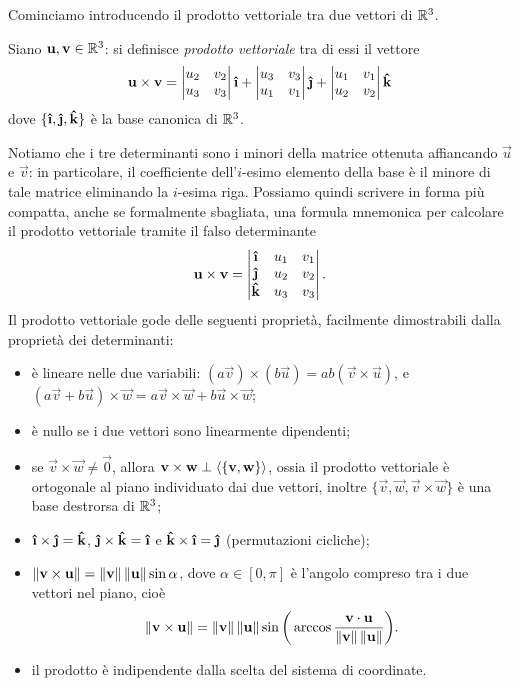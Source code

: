 Cominciamo introducendo il prodotto vettoriale tra due vettori di $\mathbb{R}^3$.
\begin{definizione} \label{d:prodotto-vettoriale}
	Siano $\mathbf{u},\mathbf{v}\in\mathbb{R}^3$: si definisce \emph{prodotto vettoriale} tra di essi il vettore
	\begin{equation}
		\vec u\times\vec v=
		\begin{vmatrix}
			u_2& v_2\\u_3&v_3
		\end{vmatrix}\ii+
		\begin{vmatrix}
			u_3&v_3\\u_1&v_1
		\end{vmatrix}\jj+
		\begin{vmatrix}
			u_1&v_1\\u_2&v_2
		\end{vmatrix}\kk
		\label{eq:prodotto-vettoriale}
	\end{equation}
	dove $\{\ii,\jj,\kk\}$ è la base canonica di $\mathbb{R}^3$.
\end{definizione}
Notiamo che i tre determinanti sono i minori della matrice ottenuta affiancando $\vec u$ e $\vec v$: in particolare, il coefficiente dell'$i$-esimo elemento della base è il minore di tale matrice eliminando la $i$-esima riga.
Possiamo quindi scrivere in forma più compatta, anche se formalmente sbagliata, una formula mnemonica per calcolare il prodotto vettoriale tramite il falso determinante
\begin{equation*}
	\vec u\times\vec v=
	\begin{vmatrix}
		\ii& u_1& v_1\\
		\jj& u_2& v_2\\
		\kk& u_3& v_3
	\end{vmatrix}.
\end{equation*}
Il prodotto vettoriale gode delle seguenti proprietà, facilmente dimostrabili dalla proprietà dei determinanti:
\begin{itemize}
	\item è lineare nelle due variabili: $(a\vec v)\times(b\vec u)=ab(\vec v\times\vec u)$, e $(a\vec v+b\vec u)\times\vec w=a\vec v\times\vec w+b\vec u\times\vec w$;
	\item è nullo se i due vettori sono linearmente dipendenti;
	\item se $\vec v\times\vec w\neq\vec 0$, allora $\mathbf{v}\times\mathbf{w}\perp\left\langle{\{\mathbf{v},\mathbf{w}\}}\right\rangle$, ossia il prodotto vettoriale è ortogonale al piano individuato dai due vettori, inoltre $\{\vec v,\vec w,\vec v\times\vec w\}$ è una base destrorsa di $\mathbb{R}^3$;
	\item $\ii\times\jj=\kk$, $\jj\times\kk=\ii$ e $\kk\times\ii=\jj$ (permutazioni cicliche);
	\item $\left\|{\mathbf{v}\times\mathbf{u}}\right\|=\left\|{\mathbf{v}}\right\|\left\|{\mathbf{u}}\right\|\sin\alpha$, dove $\alpha\in[0,\pi]$ è l'angolo compreso tra i due vettori nel piano, cioè
		\begin{equation}
			\left\|{\mathbf{v}\times\mathbf{u}}\right\|=\left\|{\mathbf{v}}\right\|\left\|{\mathbf{u}}\right\|\sin\bigg(\arccos\frac{{\mathbf{v}}\cdot{\mathbf{u}}}{\left\|{\mathbf{v}}\right\|\left\|{\mathbf{u}}\right\|}\bigg).
		\end{equation}
	\item il prodotto è indipendente dalla scelta del sistema di coordinate.
\end{itemize}
